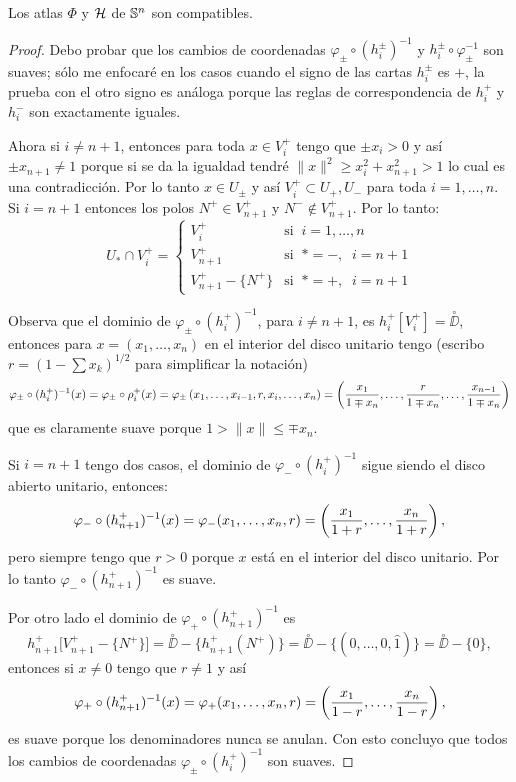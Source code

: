 \begin{ejercicio}\label{ej:18}
  Los atlas $\Phi$ y $\mathcal{H}$ de $\mathbb{S}^n$ son compatibles.
\end{ejercicio}

\begin{proof}%
  Debo probar que los cambios de coordenadas $\varphi_{\pm}\circ(h_i^{\pm})^{-1}$ y
  $h_i^{\pm}\circ\varphi_{\pm}^{-1}$ son suaves; s\'olo me enfocar\'e en los casos cuando el signo de las
  cartas $h_i^{\pm}$ es $+$, la prueba con el otro signo es an\'aloga porque las reglas de
  correspondencia de $h_i^+$ y $h_i^-$ son exactamente iguales.  

  Ahora si $i\neq n+1$, entonces
  para toda $x\in V_i^+$ tengo que $\pm x_i>0$ y as\'i $\pm x_{n+1}\neq 1$ porque si se da la
  igualdad tendr\'e $\|x\|^2\geq x_i^2+x_{n+1}^2>1$ lo cual es una contradicci\'on. Por lo tanto
  $x\in U_{\pm}$ y as\'i $V_i^+\subset U_+,U_-$ para toda $i=1,\ldots,n$. Si $i=n+1$ entonces
  los polos $N^+\in V_{n+1}^+$ y $N^-\not\in V_{n+1}^+$. Por lo tanto:
  \[
    U_{*}\cap V_i^+=
    \begin{cases}
      V_i^+  &\text{si}\;\; i=1,\ldots,n \\
      V_{n+1}^+ &\text{si}\;\; *=-,\;\; i=n+1 \\
      V_{n+1}^+-\{N^+\} &\text{si}\;\; *=+,\;\; i=n+1 
    \end{cases}
  \]

  Observa que el dominio de $\varphi_{\pm}\circ(h_i^+)^{-1}$, para $i\neq n+1$, es
  $h_i^+[V_i^+]=\overset{\circ}{\DD}$, entonces para $x=(x_1,\ldots,x_n)$ en el interior del
  disco unitario tengo (escribo $r=(1-\sum x_k)^{1/2}$ para simplificar la notaci\'on)
  \[
    \varphi_{\pm}\circ(h_i^+)^{-1}(x) =
    \varphi_{\pm}\circ\rho_i^+(x)=
    \varphi_{\pm} \left( x_1,\ldots,x_{i-1},r,x_{i},\ldots,x_n \right) =
    \left( \frac{x_1}{1\mp x_n},\ldots,\frac{r}{1\mp x_n},\ldots,\frac{x_{n-1}}{1\mp x_n} \right)
  \]
  que es claramente suave porque $1>\|x\|\leq \mp x_n$.

  Si $i=n+1$ tengo dos casos, el dominio de $\varphi_-\circ(h_i^+)^{-1}$ sigue siendo el disco abierto
  unitario, entonces:
  \[
    \varphi_-\circ(h_{n+1}^+)^{-1}(x)=
    \varphi_-(x_1,\ldots,x_n,r)=
    \left( \frac{x_1}{1+r},\ldots,\frac{x_n}{1+r} \right),
  \]
  pero siempre tengo que $r>0$ porque $x$ est\'a en el interior del disco unitario. Por lo tanto
  $\varphi_-\circ(h_{n+1}^+)^{-1}$ es suave.

  Por otro lado el dominio de $\varphi_+\circ(h_{n+1}^+)^{-1}$ es
  \[
    h_{n+1}^+\big[V_{n+1}^+-\{N^+\}\big]=
    \overset{\circ}{\DD}-\{h_{n+1}^+(N^+)\}=
    \overset{\circ}{\DD}-\{(0,\ldots,0,\widehat{1})\}=
    \overset{\circ}{\DD}-\{0\},
  \]
  entonces si $x\neq0$ tengo que $r\neq 1$ y as\'i
  \[
    \varphi_+\circ(h_{n+1}^+)^{-1}(x)=
    \varphi_+(x_1,\ldots,x_n,r)=
    \left( \frac{x_1}{1-r},\ldots,\frac{x_n}{1-r} \right),
  \]
  es suave porque los denominadores nunca se anulan. Con esto concluyo que todos los cambios de
  coordenadas $\varphi_{\pm}\circ(h_i^+)^{-1}$ son suaves.


\end{proof}
